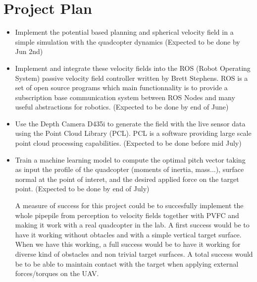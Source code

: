 \section{Project Plan}
\begin{itemize}
    \item Implement the potential based planning and spherical velocity field in a simple simulation with the quadcopter dynamics (Expected to be done by Jun 2nd)
    \item Implement and integrate these velocity fields into the ROS (Robot Operating System) passive velocity field controller written by Brett Stephens. ROS is a set of open source programs which main functionnality is to provide a subscription base communication system between ROS Nodes and many useful abstractions for robotics. (Expected to be done by end of June)
    \item Use the Depth Camera D435i to generate the field with the live sensor data using the Point Cloud Library \cite{rusu20113d} (PCL). PCL is a software providing large scale point cloud processing capabilities. (Expected to be done before mid July)
    \item Train a machine learning model to compute the optimal pitch vector taking as input the profile of the quadcopter (moments of inertia, mass...), surface normal at the point of interet,  and the desired applied force on the target point. (Expected to be done by end of July)

A measure of success for this project could be to succesfully implement the whole pipepile from perception to velocity fields together with PVFC and making it work with a real quadcopter in the lab. A first success would be to have it working without obtacles and with a simple vertical target surface. 
When we have this working, a full success would be to have it working for diverse kind of obstacles and non trivial target surfaces.
A total success would be to be able to maintain contact with the target when applying external forces/torques on the UAV. 
\end{itemize}